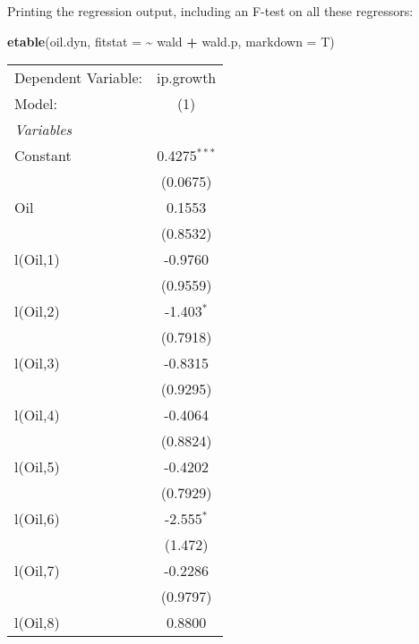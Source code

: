 \documentclass[
]{article}
\newenvironment{Shaded}{\begin{snugshade}}{\end{snugshade}}
\newcommand{\AttributeTok}[1]{\textcolor[rgb]{0.13,0.29,0.53}{#1}}
\newcommand{\FunctionTok}[1]{\textcolor[rgb]{0.13,0.29,0.53}{\textbf{#1}}}
\newcommand{\NormalTok}[1]{#1}
\newcommand{\SpecialCharTok}[1]{\textcolor[rgb]{0.81,0.36,0.00}{\textbf{#1}}}
\begin{document}
Printing the regression output, including an F-test on all these
regressors:

\begin{Shaded}
\begin{Highlighting}[]
\FunctionTok{etable}\NormalTok{(oil.dyn, }\AttributeTok{fitstat =} \SpecialCharTok{\textasciitilde{}}\NormalTok{ wald }\SpecialCharTok{+}\NormalTok{ wald.p, }\AttributeTok{markdown =}\NormalTok{ T)}
\end{Highlighting}
\end{Shaded}

\begingroup
\centering
\begin{tabular}{lc}
   \tabularnewline \midrule \midrule
   Dependent Variable:           & ip.growth\\  
   Model:                        & (1)\\  
   \midrule
   \emph{Variables}\\
   Constant                      & 0.4275$^{***}$\\   
                                 & (0.0675)\\   
   Oil                           & 0.1553\\   
                                 & (0.8532)\\   
   l(Oil,1)                      & -0.9760\\   
                                 & (0.9559)\\   
   l(Oil,2)                      & -1.403$^{*}$\\   
                                 & (0.7918)\\   
   l(Oil,3)                      & -0.8315\\   
                                 & (0.9295)\\   
   l(Oil,4)                      & -0.4064\\   
                                 & (0.8824)\\   
   l(Oil,5)                      & -0.4202\\   
                                 & (0.7929)\\   
   l(Oil,6)                      & -2.555$^{*}$\\   
                                 & (1.472)\\   
   l(Oil,7)                      & -0.2286\\   
                                 & (0.9797)\\   
   l(Oil,8)                      & 0.8800\\   

\end{tabular}
\end{document}
